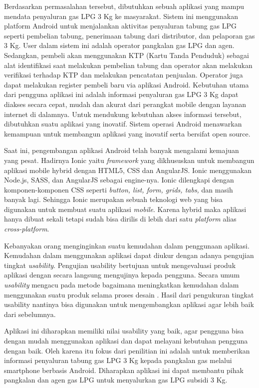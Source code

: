\par Berdasarkan permasalahan tersebut, dibutuhkan sebuah aplikasi yang mampu mendata penyaluran gas LPG 3 Kg ke masyarakat. Sistem ini menggunakan platform Android untuk menjalankan aktivitas penyaluran tabung gas LPG seperti pembelian tabung, penerimaan tabung dari distributor, dan pelaporan gas 3 Kg. User dalam sistem ini adalah operator pangkalan gas LPG dan agen. Sedangkan, pembeli akan menggunakan KTP (Kartu Tanda Penduduk) sebagai alat identifikasi saat melakukan pembelian tabung dan operator akan melakukan verifikasi terhadap KTP dan melakukan pencatatan penjualan. Operator juga dapat melakukan register pembeli baru via aplikasi Android. Kebutuhan utama dari pengguna aplikasi ini adalah informasi penyaluran gas LPG 3 Kg dapat diakses secara cepat, mudah dan akurat dari perangkat mobile dengan layanan internet di dalamnya. Untuk mendukung kebutuhan akses informasi tersebut, dibutuhkan suatu aplikasi yang inovatif. Sistem operasi Android menawarkan kemampuan untuk membangun aplikasi yang inovatif serta bersifat open source.
\par Saat ini, pengembangan aplikasi Android telah banyak mengalami kemajuan yang pesat. Hadirnya Ionic yaitu \textit{framework} yang dikhususkan untuk membangun aplikasi mobile hybrid dengan HTML5, CSS dan AngularJS. Ionic menggunakan Node.js, SASS, dan AngularJS sebagai engine-nya. Ionic dilengkapi dengan komponen-komponen CSS seperti \textit{button, list, form, grids, tabs,} dan masih banyak lagi. Sehingga Ionic merupakan sebuah teknologi web yang bisa digunakan untuk membuat suatu aplikasi \textit{mobile}. Karena hybrid maka aplikasi hanya dibuat sekali tetapi sudah bisa dirilis di lebih dari satu \textit{platform} alias \textit{cross-platform}.
\par Kebanyakan orang menginginkan suatu kemudahan dalam penggunaan aplikasi. Kemudahan dalam menggunakan aplikasi dapat diukur dengan adanya pengujian tingkat \textit{usability}. Pengujian usability bertujuan untuk mengevaluasi produk aplikasi dengan secara langsung mengujinya kepada pengguna. Secara umum \textit{usability} mengacu pada metode bagaimana meningkatkan kemudahan dalam menggunakan suatu produk selama proses desain \citep{nielsen2012}. Hasil dari pengukuran tingkat usability nantinya bisa digunakan untuk mengembangkan aplikasi agar lebih baik dari sebelumnya.
\par Aplikasi ini diharapkan memiliki nilai usability yang baik, agar pengguna bisa dengan mudah menggunakan aplikasi dan dapat melayani kebutuhan pengguna dengan baik. Oleh karena itu fokus dari penilitian ini adalah untuk memberikan informasi penyaluran tabung gas LPG 3 Kg kepada pangkalan gas melalui smartphone berbasis Android. Diharapkan aplikasi ini dapat membantu pihak pangkalan dan agen gas LPG untuk menyalurkan gas LPG subsidi 3 Kg.

